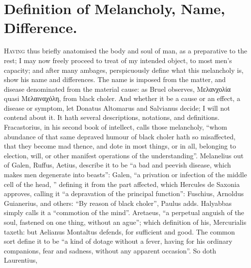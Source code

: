\section{Definition of Melancholy, Name, Difference.}\label{sec:definition}
\lettrine{H}{aving} thus briefly anatomised the body and soul of man, as a
preparative to the rest; I may now freely proceed to treat of my intended
object, to most men's capacity; and after many ambages, perspicuously define
what this melancholy is, show his name and differences. The name is imposed
from the matter, and disease denominated from the material cause: as Bruel
observes, \textgreek{Μελανχολία} quasi \textgreek{Μελαιναχόλη}, from black
choler. And whether it be a cause or an effect, a disease or symptom, let
Donatus Altomarus and Salvianus decide; I will not contend about it. It hath
several descriptions, notations, and definitions.
Fracastorius, in his second book of intellect, calls those
melancholy, \enquote{whom abundance of that same depraved humour of black choler hath
so misaffected, that they become mad thence, and dote in most things, or in
all, belonging to election, will, or other manifest operations of the
understanding}. Melanelius out of Galen, Ruffus, Aetius,
describe it to be \enquote{a bad and peevish disease, which makes men degenerate into
beasts}: Galen, \enquote{a privation or infection of the middle cell of the head,
\etc{}} defining it from the part affected, which Hercules
de Saxonia approves,  calling it \enquote{a
depravation of the principal function}: Fuschius,  Arnoldus 
Guianerius, and others: \enquote{By reason of black choler}, Paulus adds. Halyabbas
simply calls it a \enquote{commotion of the mind}. Aretaeus, \enquote{a
perpetual anguish of the soul, fastened on one thing, without an ague}; which
definition of his, Mercurialis  taxeth: but Aelianus Montaltus defends,  for sufficient and good. The common sort define it to
be \enquote{a kind of dotage without a fever, having for his ordinary companions, fear
and sadness, without any apparent occasion}. So doth Laurentius,
